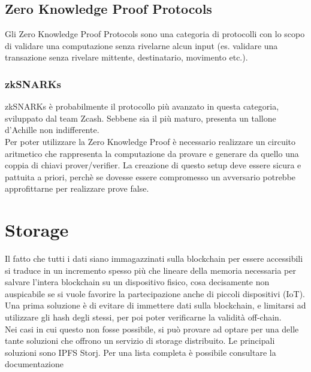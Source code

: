 \documentclass[12pt, letterpaper, twoside]{article}
\begin{document}
\subsection{Zero Knowledge Proof Protocols}
Gli Zero Knowledge Proof Protocols sono una categoria di protocolli con lo scopo di validare una computazione senza rivelarne alcun input (es. validare una transazione senza rivelare mittente, destinatario, movimento etc.). \\
 
\subsubsection{zkSNARKs}
zkSNARKs è probabilmente il protocollo più avanzato in questa categoria, sviluppato dal team Zcash. Sebbene sia il più maturo, presenta un tallone d'Achille non indifferente. \\
Per poter utilizzare la Zero Knowledge Proof è necessario realizzare un circuito aritmetico che rappresenta la computazione da provare e generare da quello una coppia di chiavi prover/verifier.
La creazione di questo setup deve essere sicura e pattuita a priori, perchè se dovesse essere compromesso un avversario potrebbe approfittarne per realizzare prove false.
 
\newpage
 
\section{Storage}
Il fatto che tutti i dati siano immagazzinati sulla blockchain per essere accessibili si traduce in un incremento spesso più che lineare della memoria necessaria per salvare l'intera blockchain su un dispositivo fisico, cosa decisamente non auspicabile se si vuole favorire la partecipazione anche di piccoli dispositivi (IoT). \\
Una prima soluzione è di evitare di immettere dati sulla blockchain, e limitarsi ad utilizzare gli hash degli stessi, per poi poter verificarne la validità off-chain. \\
Nei casi in cui questo non fosse possibile, si può provare ad optare per una delle tante soluzioni che offrono un servizio di storage distribuito.
Le principali soluzioni sono IPFS Storj.
Per una lista completa è possibile consultare la documentazione \cite{wiki:ew-storage}
 
\end{document}
